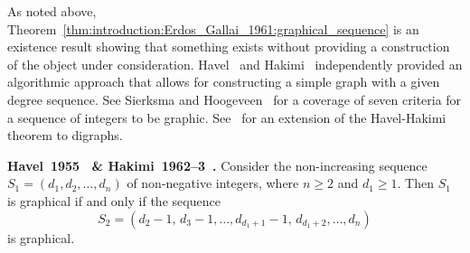 As noted above,
Theorem~\ref{thm:introduction:Erdos_Gallai_1961:graphical_sequence} is
an existence result showing that something exists without providing a
construction of the object under consideration. Havel~\cite{Havel1955}
and Hakimi~\cite{Hakimi1962,Hakimi1963} independently provided an
algorithmic approach that allows for constructing a simple graph with
a given degree sequence. See Sierksma and
Hoogeveen~\cite{SierksmaHoogeveen1991} for a coverage of seven
criteria for a sequence of integers to be graphic.
See~\cite{ErdosEtal2010} for an extension of the Havel-Hakimi theorem
to digraphs.

\begin{theorem}
\label{thm:introduction:Havel1955_Hakimi1962:graphical_sequence}
\textbf{Havel~1955~\cite{Havel1955} \&
  Hakimi~1962--3~\cite{Hakimi1962,Hakimi1963}.}
Consider the non-increasing sequence $S_1 = (d_1, d_2, \dots, d_n)$ of
non-negative integers, where $n \geq 2$ and $d_1 \geq 1$. Then $S_1$ is
graphical if and only if the sequence
\[
S_2
=
(d_2 - 1,\, d_3 - 1, \dots, d_{d_1 + 1} - 1,\, d_{d_1 + 2}, \dots, d_n)
\]
is graphical.
\end{theorem}

